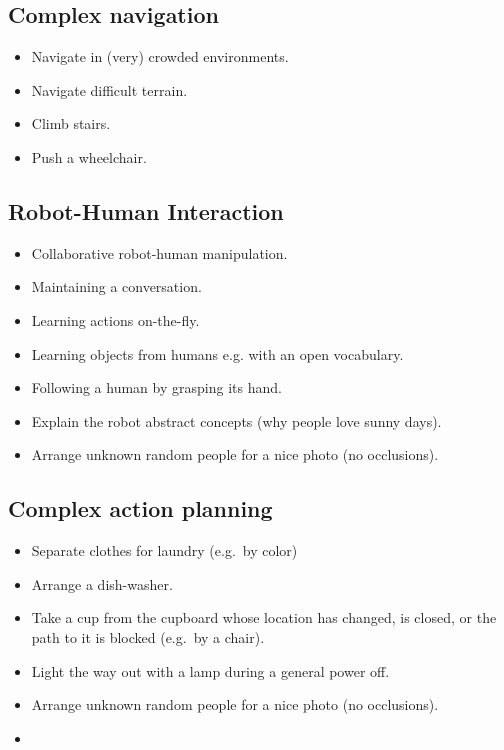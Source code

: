 \subsection{Complex navigation}
\begin{itemize}
	\item Navigate in (very) crowded environments.
	\item Navigate difficult terrain.
	\item Climb stairs.
	\item Push a wheelchair.
\end{itemize}

\subsection{Robot-Human Interaction}
\begin{itemize}
	\item Collaborative robot-human manipulation.
	\item Maintaining a conversation.
	\item Learning actions on-the-fly.
	\item Learning objects from humans e.g.  with an open vocabulary.
	\item Following a human by grasping its hand.
	\item Explain the robot abstract concepts (why people love sunny days).
	\item Arrange unknown random people for a nice photo (no occlusions).
\end{itemize}

\subsection{Complex action planning} 
\begin{itemize}
	\item Separate clothes for laundry (e.g.~by color)
	\item Arrange a dish-washer.
	\item Take a cup from the cupboard whose location has changed, is closed, or the path to it is blocked (e.g.~by a chair).
	\item Light the way out with a lamp during a general power off.
	\item Arrange unknown random people for a nice photo (no occlusions).
	\item 
\end{itemize}


